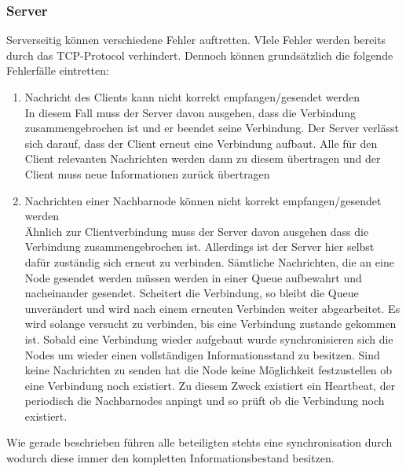 \subsubsection{Server}
Serverseitig können verschiedene Fehler auftretten. VIele Fehler werden bereits durch das TCP-Protocol verhindert. Dennoch können grundsätzlich die folgende Fehlerfälle eintretten:
\begin{enumerate}
    \item Nachricht des Clients kann nicht korrekt empfangen/gesendet werden\\
        In diesem Fall muss der Server davon ausgehen, dass die Verbindung zusammengebrochen ist und er beendet seine Verbindung. Der Server verlässt sich darauf, dass der Client erneut eine Verbindung aufbaut. Alle für den Client relevanten Nachrichten werden dann zu diesem übertragen und der Client muss neue Informationen zurück übertragen
    \item Nachrichten einer Nachbarnode können nicht korrekt empfangen/gesendet werden\\
        Ähnlich zur Clientverbindung muss der Server davon ausgehen dass die Verbindung zusammengebrochen ist. Allerdings ist der Server hier selbst dafür zuständig sich erneut zu verbinden. Sämtliche Nachrichten, die an eine Node gesendet werden müssen werden in einer Queue aufbewahrt und nacheinander gesendet. Scheitert die Verbindung, so bleibt die Queue unverändert und wird nach einem erneuten Verbinden weiter abgearbeitet. Es wird solange versucht zu verbinden, bis eine Verbindung zustande gekommen ist. Sobald eine Verbindung wieder aufgebaut wurde synchronisieren sich die Nodes um wieder einen vollständigen Informationsstand zu besitzen.
        Sind keine Nachrichten zu senden hat die Node keine Möglichkeit festzustellen ob eine Verbindung noch existiert. Zu diesem Zweck existiert ein Heartbeat, der periodisch die Nachbarnodes anpingt und so prüft ob die Verbindung noch existiert.
\end{enumerate}
Wie gerade beschrieben führen alle beteiligten stehts eine synchronisation durch wodurch diese immer den kompletten Informationsbestand besitzen.



